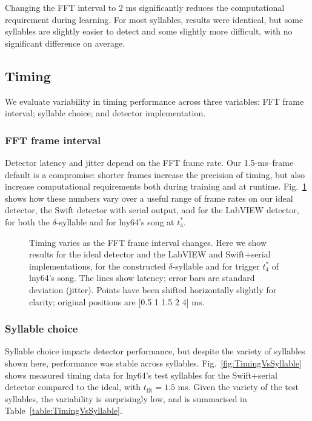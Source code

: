 \documentclass[10pt,letterpaper]{article}
\newcommand\fig[1]{Fig.~\ref{#1}}
\begin{document}
Changing the FFT interval to 2 ms significantly reduces the
computational requirement during learning. For most syllables, results
were identical, but some syllables are slightly easier to detect and
some slightly more difficult, with no significant difference on
average.

\subsection{Timing}

We evaluate variability in timing performance across three variables:
FFT frame interval; syllable choice; and detector implementation.

\subsubsection{FFT frame interval}

Detector latency and jitter depend on the FFT frame rate.  Our
1.5-ms--frame default is a compromise: shorter frames increase the
precision of timing, but also increase computational requirements both
during training and at runtime.  \fig{fig:TimingVsFrame} shows how
these numbers vary over a useful range of frame rates on our ideal
detector, the Swift detector with serial output, and for the LabVIEW
detector, for both the $\delta$-syllable and for lny64's song at
$t^*_4$.

\begin{figure}
  \caption{Timing varies as the FFT frame interval changes.  Here we
    show results for the ideal detector and the LabVIEW and
    Swift+serial implementations, for the constructed
    $\delta$-syllable and for trigger $t^*_4$ of lny64's song.  The
    lines show latency; error bars are standard deviation (jitter).  Points have
    been shifted horizontally slightly for clarity; original positions are [0.5 1
      1.5 2 4] ms.}
  \label{fig:TimingVsFrame}
\end{figure}

\subsubsection{Syllable choice}

Syllable choice impacts detector performance, but despite the variety
of syllables shown here, performance was stable across syllables.
\fig{fig:TimingVsSyllable} shows measured timing data for lny64's test
syllables for the Swift+serial detector compared to the ideal, with
$t_{\textrm{fft}}=1.5$ ms.  Given the variety of the test syllables,
the variability is surprisingly low, and is summarised in
Table~\ref{table:TimingVsSyllable}.
\end{document}
